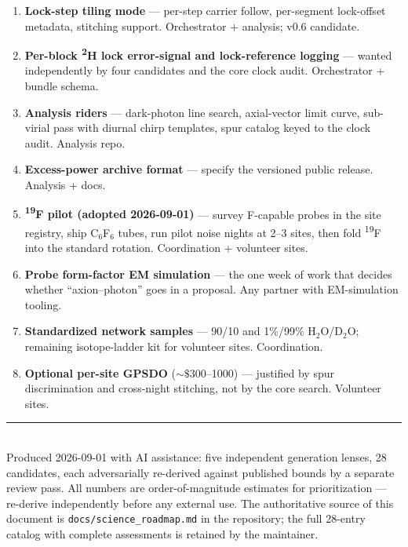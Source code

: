 \documentclass[11pt]{article}
\newcommand{\dnmr}{\textsuperscript{2}H}
\newcommand{\fnmr}{\textsuperscript{19}F}
\begin{document}
\begin{enumerate}[leftmargin=1.6em,itemsep=1pt,topsep=2pt]
\item \textbf{Lock-step tiling mode} --- per-step carrier follow, per-segment
lock-offset metadata, stitching support. {\small\textcolor{inkfaint}{Orchestrator
+ analysis; v0.6 candidate.}}
\item \textbf{Per-block \dnmr{} lock error-signal and lock-reference logging}
--- wanted independently by four candidates and the core clock audit.
{\small\textcolor{inkfaint}{Orchestrator + bundle schema.}}
\item \textbf{Analysis riders} --- dark-photon line search, axial-vector limit
curve, sub-virial pass with diurnal chirp templates, spur catalog keyed to the
clock audit. {\small\textcolor{inkfaint}{Analysis repo.}}
\item \textbf{Excess-power archive format} --- specify the versioned public
release. {\small\textcolor{inkfaint}{Analysis + docs.}}
\item \textbf{\fnmr{} pilot (adopted 2026-09-01)} --- survey F-capable probes in
the site registry, ship C$_6$F$_6$ tubes, run pilot noise nights at 2--3 sites,
then fold \fnmr{} into the standard rotation.
{\small\textcolor{inkfaint}{Coordination + volunteer sites.}}
\item \textbf{Probe form-factor EM simulation} --- the one week of work that
decides whether ``axion--photon'' goes in a proposal.
{\small\textcolor{inkfaint}{Any partner with EM-simulation tooling.}}
\item \textbf{Standardized network samples} --- 90/10 and 1\%/99\%
H$_2$O/D$_2$O; remaining isotope-ladder kit for volunteer sites.
{\small\textcolor{inkfaint}{Coordination.}}
\item \textbf{Optional per-site GPSDO} (${\sim}\$300$--1000) --- justified by
spur discrimination and cross-night stitching, not by the core search.
{\small\textcolor{inkfaint}{Volunteer sites.}}
\end{enumerate}

\vspace{6pt}
\noindent\rule{\linewidth}{0.4pt}\\[3pt]
{\footnotesize\textcolor{inkfaint}{Produced 2026-09-01 with AI assistance: five
independent generation lenses, 28 candidates, each adversarially re-derived
against published bounds by a separate review pass. All numbers are
order-of-magnitude estimates for prioritization --- re-derive independently
before any external use. The authoritative source of this document is
\texttt{docs/science\_roadmap.md} in the repository; the full 28-entry catalog
with complete assessments is retained by the maintainer.}}
\end{document}

